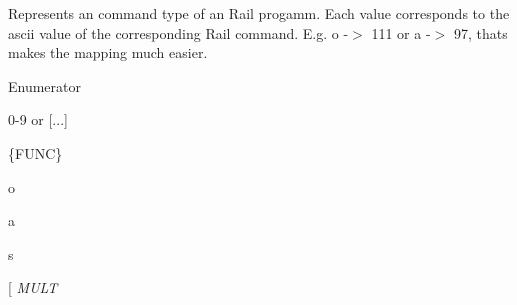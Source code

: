Represents an command type of an Rail progamm. Each value corresponds to the ascii value of the corresponding Rail command. E.\-g. o -\/$>$ 111 or a -\/$>$ 97, thats makes the mapping much easier. \begin{Desc}
\item[Enumerator]\par
\begin{description}
\item[{\em 
\hypertarget{structCommand_a4ca33b8d40e12deca5e7bb4190426ee1aa9601dbf610b9d23ee4b8b7bd378175e}{P\-U\-S\-H\-\_\-\-C\-O\-N\-S\-T}\label{structCommand_a4ca33b8d40e12deca5e7bb4190426ee1aa9601dbf610b9d23ee4b8b7bd378175e}
}]0-\/9 or \mbox{[}...\mbox{]} \item[{\em 
\hypertarget{structCommand_a4ca33b8d40e12deca5e7bb4190426ee1ab8db68a1487bc3f5dc3a9289e6a3b761}{C\-A\-L\-L}\label{structCommand_a4ca33b8d40e12deca5e7bb4190426ee1ab8db68a1487bc3f5dc3a9289e6a3b761}
}]\{F\-U\-N\-C\} \item[{\em 
\hypertarget{structCommand_a4ca33b8d40e12deca5e7bb4190426ee1a6fbf52940c97a769906201ea768361c6}{O\-U\-T\-P\-U\-T}\label{structCommand_a4ca33b8d40e12deca5e7bb4190426ee1a6fbf52940c97a769906201ea768361c6}
}]o \item[{\em 
\hypertarget{structCommand_a4ca33b8d40e12deca5e7bb4190426ee1a1189491a065b6e6ca344cad213b618ff}{A\-D\-D}\label{structCommand_a4ca33b8d40e12deca5e7bb4190426ee1a1189491a065b6e6ca344cad213b618ff}
}]a \item[{\em 
\hypertarget{structCommand_a4ca33b8d40e12deca5e7bb4190426ee1a7e3944da56a06f7078ade3e53cfbb215}{S\-U\-B}\label{structCommand_a4ca33b8d40e12deca5e7bb4190426ee1a7e3944da56a06f7078ade3e53cfbb215}
}]s \item[{\em 
\hypertarget{structCommand_a4ca33b8d40e12deca5e7bb4190426ee1a7b47a91ef35876e3a36f215ca67cc52a}{M\-U\-L\-T}\label{structCommand_a4ca33b8d40e12deca5e7bb4190426ee1a7b47a91ef35876e3a36f215ca67cc52a}
}
\end{description}
\end{Desc}
